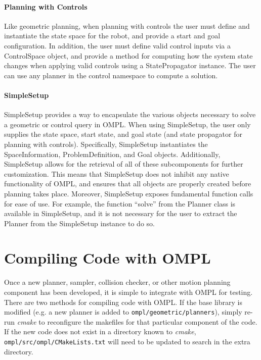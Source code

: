 \paragraph {Planning with Controls}
Like geometric planning, when planning with controls the user must define and 
instantiate the state space for the robot, and provide a start and goal 
configuration.  In addition, the user must define valid control inputs via
a ControlSpace object, and provide a method for computing how the system state
changes when applying valid controls using a StatePropagator instance.  The 
user can use any planner in the control namespace to compute a solution.

\paragraph {SimpleSetup}
SimpleSetup provides a way to encapsulate the various objects necessary to 
solve a geometric or control query in OMPL.  When using SimpleSetup, the user
only supplies the state space, start state, and goal state (and state propagator
for planning with controls). Specifically, SimpleSetup instantiates the 
SpaceInformation, ProblemDefinition, and Goal objects.  Additionally, 
SimpleSetup allows for the retrieval of all of these subcomponents for further 
customization.  This means that SimpleSetup does not inhibit any native 
functionality of OMPL, and ensures that all objects are properly created before
planning takes place.  Moreover, SimpleSetup exposes fundamental function 
calls for ease of use.  For example, the function ``solve'' from the Planner
class is available in SimpleSetup, and it is not necessary for the user to 
extract the Planner from the SimpleSetup instance to do so.

\section {Compiling Code with OMPL}
Once a new planner, sampler, collision checker, or other motion planning 
component has been developed, it is simple to integrate with OMPL for testing.
There are two methods for compiling code with OMPL.  If the base library is
modified (e.g. a new planner is added to  {\tt ompl/geometric/planners}),
simply re-run \emph{cmake} to reconfigure the makefiles for that particular 
component of the code.  If the new code does not exist in a directory known to 
\emph{cmake}, {\tt ompl/src/ompl/CMakeLists.txt} will need to be updated to 
search in the extra directory.


